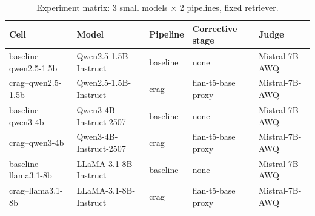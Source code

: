 \begin{table}[h]
\centering
\caption{Experiment matrix: 3 small models $\times$ 2 pipelines, fixed retriever.}
\label{tab:matrix}
\begin{tabular}{lllll}
\toprule
\textbf{Cell} & \textbf{Model} & \textbf{Pipeline} & \textbf{Corrective stage} & \textbf{Judge} \\
\midrule
baseline--qwen2.5-1.5b & Qwen2.5-1.5B-Instruct & baseline & none & Mistral-7B-AWQ \\
crag--qwen2.5-1.5b & Qwen2.5-1.5B-Instruct & crag & flan-t5-base proxy & Mistral-7B-AWQ \\
baseline--qwen3-4b & Qwen3-4B-Instruct-2507 & baseline & none & Mistral-7B-AWQ \\
crag--qwen3-4b & Qwen3-4B-Instruct-2507 & crag & flan-t5-base proxy & Mistral-7B-AWQ \\
baseline--llama3.1-8b & LLaMA-3.1-8B-Instruct & baseline & none & Mistral-7B-AWQ \\
crag--llama3.1-8b & LLaMA-3.1-8B-Instruct & crag & flan-t5-base proxy & Mistral-7B-AWQ \\
\bottomrule
\end{tabular}
\end{table}
